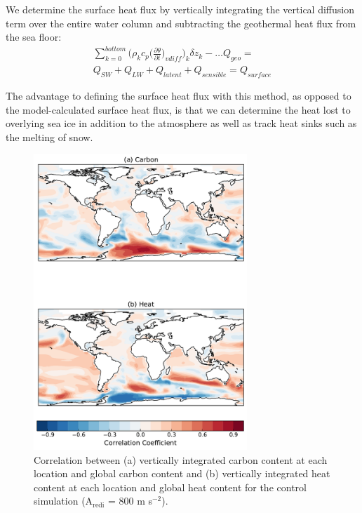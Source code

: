 We determine the surface heat flux by vertically integrating the vertical
diffusion term over the entire water column and subtracting the geothermal heat
flux from the sea floor:
\begin{equation}
\begin{split}
\sum_{k = 0}^{bottom} {\bigg( \rho_k c_{p} {\bigg(\frac{\partial \theta}{\partial t}
\bigg)_{vdiff}}\bigg)_k}\delta z_k
 -… Q_{geo} = \\
Q_{SW} + Q_{LW} + Q_{latent} + Q_{sensible} = Q_{surface}
\end{split}
\end{equation}

The advantage to defining the surface heat flux with this method, as opposed to
the model-calculated surface heat flux, is that we can determine the heat
lost to overlying sea ice in addition to the atmosphere as well as track heat
sinks such as the melting of snow.

\begin{figure}
\centering
\includegraphics[width=19pc]{figure2.pdf}
\caption{Correlation between (a) vertically integrated carbon content at each
location and global carbon content and (b) vertically integrated heat content at
each location and global heat content for the control simulation
(A$_{\mathrm{redi}}$ = 800 m s$^{-2}$).}
\label{fig:heat_carbon_correlations}
\end{figure}

